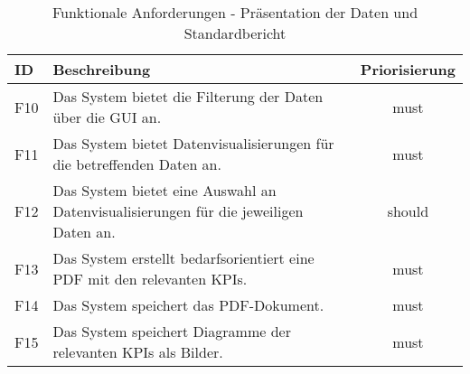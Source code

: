 \begingroup
\setlength{\tabcolsep}{10pt} %
\renewcommand{\arraystretch}{1.25} 
\begin{table}[H]
    \centering
    \begin{adjustbox}{max width=\textwidth}
    \begin{tabular}{lp{13cm}c}
       \toprule
       \textbf{ID}          & \textbf{Beschreibung} &\textbf{Priorisierung}\\
       \midrule
        F10                              &Das System bietet die Filterung der Daten über die GUI an.  & must\\
        F11                              &Das System bietet Datenvisualisierungen für die betreffenden Daten an. & must\\
        F12                              &Das System bietet eine Auswahl an Datenvisualisierungen für die jeweiligen Daten an. & should\\
        F13                              &Das System erstellt bedarfsorientiert eine PDF mit den relevanten KPIs. & must\\
        F14                              &Das System speichert das PDF-Dokument. & must\\
        F15                              &Das System speichert Diagramme der relevanten KPIs als Bilder. & must\\
        \bottomrule
    \end{tabular}
    \end{adjustbox}
    \caption{%
        Funktionale Anforderungen - Präsentation der Daten und Standardbericht
    }
    \label{tab:funktionale Anforderungen III}
    \end{table}
\endgroup






